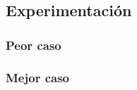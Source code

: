 \subsection{Experimentación}




 

\subsubsection{Peor caso}

\subsubsection{Mejor caso}



\newpage
